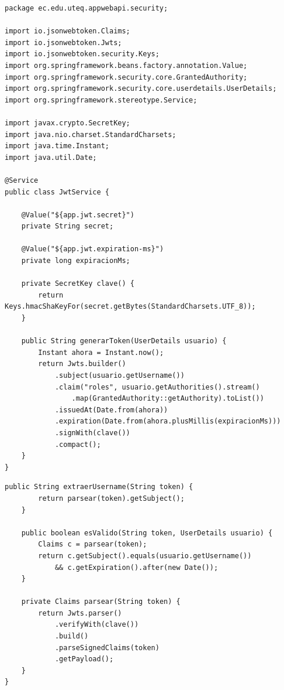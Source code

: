 \documentclass[11pt]{article}
\begin{document}
\begin{cajacodigo}
\begin{lstlisting}[style=java]
package ec.edu.uteq.appwebapi.security;

import io.jsonwebtoken.Claims;
import io.jsonwebtoken.Jwts;
import io.jsonwebtoken.security.Keys;
import org.springframework.beans.factory.annotation.Value;
import org.springframework.security.core.GrantedAuthority;
import org.springframework.security.core.userdetails.UserDetails;
import org.springframework.stereotype.Service;

import javax.crypto.SecretKey;
import java.nio.charset.StandardCharsets;
import java.time.Instant;
import java.util.Date;

@Service
public class JwtService {

    @Value("${app.jwt.secret}")
    private String secret;

    @Value("${app.jwt.expiration-ms}")
    private long expiracionMs;

    private SecretKey clave() {
        return Keys.hmacShaKeyFor(secret.getBytes(StandardCharsets.UTF_8));
    }

    public String generarToken(UserDetails usuario) {
        Instant ahora = Instant.now();
        return Jwts.builder()
            .subject(usuario.getUsername())
            .claim("roles", usuario.getAuthorities().stream()
                .map(GrantedAuthority::getAuthority).toList())
            .issuedAt(Date.from(ahora))
            .expiration(Date.from(ahora.plusMillis(expiracionMs)))
            .signWith(clave())
            .compact();
    }
}
\end{lstlisting}
\end{cajacodigo}

\begin{cajacodigo}
\begin{lstlisting}[style=java]
    public String extraerUsername(String token) {
        return parsear(token).getSubject();
    }

    public boolean esValido(String token, UserDetails usuario) {
        Claims c = parsear(token);
        return c.getSubject().equals(usuario.getUsername())
            && c.getExpiration().after(new Date());
    }

    private Claims parsear(String token) {
        return Jwts.parser()
            .verifyWith(clave())
            .build()
            .parseSignedClaims(token)
            .getPayload();
    }
}
\end{lstlisting}
\end{cajacodigo}
\end{document}
